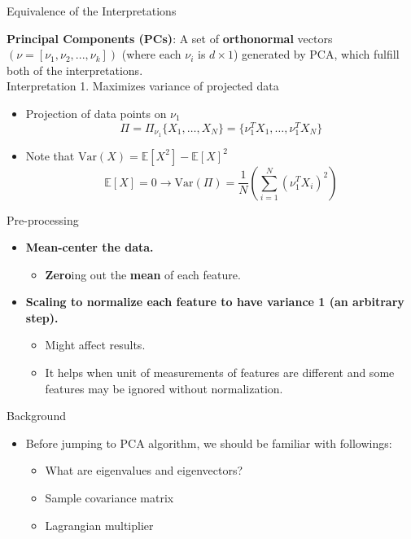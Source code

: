 \documentclass[serif, aspectratio=169]{beamer}
\begin{document}
\begin{frame}{Equivalence of the Interpretations}

    \textbf{Principal Components (PCs)}: A set of \textbf{orthonormal} vectors $(\nu = [\nu_1, \nu_2, ...,\nu_k])$ (where each $\nu_i$ is $d\times 1$) generated by PCA, which fulfill both of the interpretations.\\[0.4cm]
    
    Interpretation 1. Maximizes variance of projected data\\[0.3cm]
    \begin{itemize}
        \item Projection of data points on $\nu_1$
        $$\Pi = \Pi_{\nu_1} \{ X_{1}, \dots, X_{N} \} = \{ \nu_1^T X_{1}, \dots, \nu_1^T X_{N} \}$$
        \item Note that $\text{Var}(X) = \mathbb{E}[X^2] - \mathbb{E}[X]^2$
        $$\mathbb{E}[X] = 0 \rightarrow \text{Var}(\Pi) = \frac{1}{N} \left( \sum_{i=1}^{N} (\nu_1^T X_i)^2 \right)$$
    \end{itemize}
    
\end{frame}

\begin{frame}{Pre-processing}
    \begin{itemize}
        \item \textbf{Mean-center the data.}
            \begin{itemize}
                \item \textbf{Zero}ing out the \textbf{mean} of each feature.\\
            \end{itemize}
            
        \item \textbf{Scaling to normalize each feature to have variance 1 (an arbitrary step).}
            \begin{itemize}
                \item Might affect results.
                \item It helps when unit of measurements of features are different and some features may be ignored without normalization.
            \end{itemize}
    \end{itemize}
\end{frame}

\begin{frame}{Background}
    \begin{itemize}
        \item Before jumping to PCA algorithm, we should be familiar with followings:
        \begin{itemize}
            \item What are eigenvalues and eigenvectors?
            \item Sample covariance matrix
            \item Lagrangian multiplier
        \end{itemize}
    \end{itemize}
\end{frame}
\end{document}
